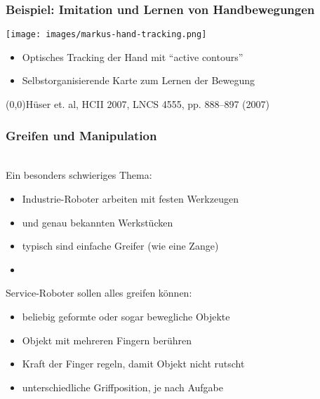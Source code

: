 \documentclass[t]{beamer}
\def\quelle#1{{\tiny \makebox(0,0){}\vfill\hfill #1}}
\def\ii{\item[]}
\begin{document}
\begin{frame}
\frametitle{Beispiel: Imitation und Lernen von Handbewegungen}
\texttt{[image: images/markus-hand-tracking.png]}
\begin{itemize}
\item Optisches Tracking der Hand mit "`active contours"'
\item Selbstorganisierende Karte zum Lernen der Bewegung
\end{itemize}
\quelle{Hüser et. al, HCII 2007, LNCS 4555, pp. 888–897 (2007)}
\end{frame}





\begin{frame}
\frametitle{Greifen und Manipulation}
\\
\vspace*{-5mm}
Ein besonders schwieriges Thema:
\begin{itemize}
\item Industrie-Roboter arbeiten mit festen Werkzeugen
\item und genau bekannten Werkstücken
\item typisch sind einfache Greifer (wie eine Zange)
\ii
\end{itemize}
Service-Roboter sollen alles greifen können:
\begin{itemize}
\item beliebig geformte oder sogar bewegliche Objekte
\item Objekt mit mehreren Fingern berühren
\item Kraft der Finger regeln, damit Objekt nicht rutscht
\item unterschiedliche Griffposition, je nach Aufgabe
\end{itemize}
\end{frame}
\end{document}
